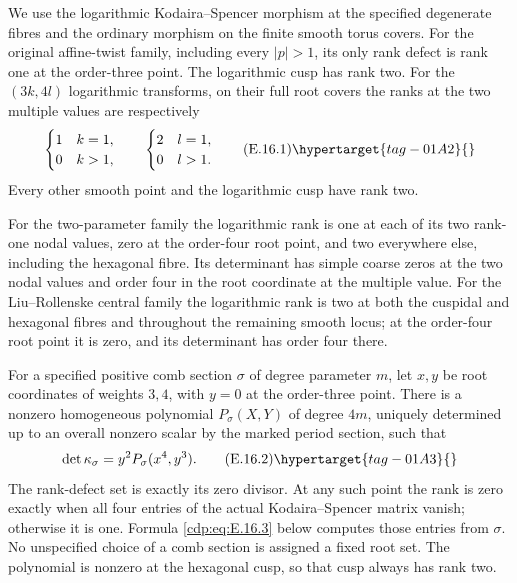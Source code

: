 \begin{proposition}\hypertarget{tag-01GN}{}\label{cdp:st:E16}

We use the logarithmic Kodaira--Spencer morphism at the specified degenerate fibres and the ordinary morphism on the finite smooth torus covers. For the original affine-twist family, including every $|p|>1$, its only rank defect is rank one at the order-three point. The logarithmic cusp has rank two. For the $(3k,4l)$ logarithmic transforms, on their full root covers the ranks at the two multiple values are respectively
\[
 \begin{cases}1&k=1,\\0&k>1,\end{cases}
 \qquad
 \begin{cases}2&l=1,\\0&l>1.\end{cases}                 \tag{E.16.1}\hypertarget{tag-01A2}{}\label{cdp:eq:E.16.1}
\]
Every other smooth point and the logarithmic cusp have rank two.

For the two-parameter family the logarithmic rank is one at each of its two rank-one nodal values, zero at the order-four root point, and two everywhere else, including the hexagonal fibre. Its determinant has simple coarse zeros at the two nodal values and order four in the root coordinate at the multiple value. For the Liu--Rollenske central family the logarithmic rank is two at both the cuspidal and hexagonal fibres and throughout the remaining smooth locus; at the order-four root point it is zero, and its determinant has order four there.

For a specified positive comb section $\sigma$ of degree parameter $m$, let $x,y$ be root coordinates of weights $3,4$, with $y=0$ at the order-three point. There is a nonzero homogeneous polynomial $P_\sigma(X,Y)$ of degree $4m$, uniquely determined up to an overall nonzero scalar by the marked period section, such that
\[
 \det\kappa_\sigma=y^2P_\sigma(x^4,y^3).             \tag{E.16.2}\hypertarget{tag-01A3}{}\label{cdp:eq:E.16.2}
\]
The rank-defect set is exactly its zero divisor. At any such point the rank is zero exactly when all four entries of the actual Kodaira--Spencer matrix vanish; otherwise it is one. Formula \eqref{cdp:eq:E.16.3} below computes those entries from $\sigma$. No unspecified choice of a comb section is assigned a fixed root set. The polynomial is nonzero at the hexagonal cusp, so that cusp always has rank two.
\end{proposition}


